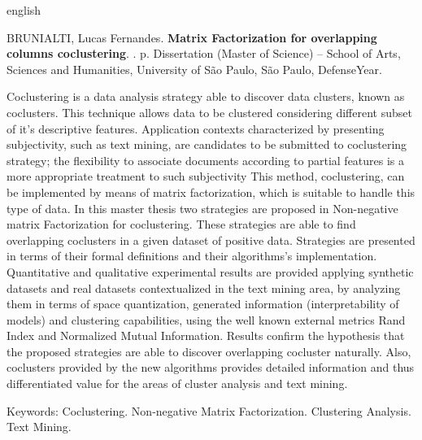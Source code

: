 \documentclass[
    12pt,                %
    oneside,            %
    a4paper,            %
    english,            %
    brazil                %
    ]{abntex2ppgsi}
\begin{document}
%
%
\begin{resumo}[Abstract]
\begin{otherlanguage*}{english}

%
%
%
%
\begin{flushleft}
BRUNIALTI, Lucas Fernandes. \textbf{Matrix Factorization for overlapping columns coclustering}. \imprimirdata. \pageref{LastPage} p. Dissertation (Master of Science) – School of Arts, Sciences and Humanities, University of São Paulo, São Paulo, DefenseYear.
\end{flushleft}

Coclustering is a data analysis strategy able to discover data clusters, known as coclusters. This technique allows data to be clustered considering different subset of it's
descriptive features.
Application contexts characterized by presenting subjectivity, such as text mining, are candidates to be submitted to coclustering strategy; the flexibility to associate documents according to partial features is a more appropriate treatment to such subjectivity
This method, coclustering, can be implemented by means of matrix factorization, which is suitable to handle this type of data.
In this master thesis two strategies are proposed in Non-negative matrix Factorization for coclustering.
These strategies are able to find overlapping coclusters in a given dataset of positive data.
Strategies are presented in terms of their formal definitions and their algorithms's implementation.
Quantitative and qualitative experimental results are provided applying synthetic datasets and real datasets contextualized in the text mining area, by analyzing them in terms of space quantization, generated information (interpretability of models) and clustering capabilities, using the well known external metrics Rand Index and Normalized Mutual Information.
Results confirm the hypothesis that the proposed strategies are able to discover overlapping cocluster naturally.
Also, coclusters provided by the new algorithms provides detailed information and thus differentiated value for the areas of cluster analysis and text mining.


Keywords: Coclustering. Non-negative Matrix Factorization. Clustering Analysis. Text Mining.
\end{otherlanguage*}
\end{resumo}
\end{document}
